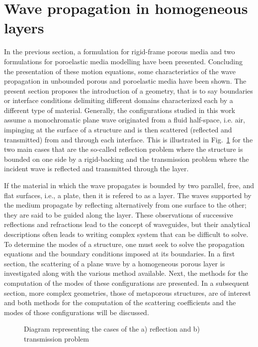 \section{Wave propagation in homogeneous layers}
In the previous section, a formulation for rigid-frame porous media and two formulations for poroelastic media modelling have been presented. Concluding the presentation of these motion equations, some characteristics of the wave propagation in unbounded porous and poroelastic media have been shown. The present section proposes the introduction of a geometry, that is to say boundaries or interface conditions delimiting different domains characterized each by a different type of material. Generally, the configurations studied in this work assume a monochromatic plane wave originated from a fluid half-space, i.e. air, impinging at the surface of a structure and is then scattered (reflected and transmitted) from and through each interface. This is illustrated in Fig.~\ref{fig:refl_transm_pb_schema} for the two main cases that are the so-called reflection problem where the structure is bounded on one side by a rigid-backing and the transmission problem where the incident wave is reflected and transmitted through the layer.

If the material in which the wave propagates is bounded by two parallel, free, and flat surfaces, i.e., a plate, then it is refered to as a layer. The waves supported by the medium propagate by reflecting alternatively from one surface to the other; they are said to be guided along the layer. These observations of successive reflections and refractions lead to the concept of waveguides, but their analytical descriptions often leads to writing complex system that can be difficult to solve. To determine the modes of a structure, one must seek to solve the propagation equations and the boundary conditions imposed at its boundaries. In a first section, the scattering of a plane wave by a homogeneous porous layer is investigated along with the various method available. Next, the methods for the computation of the modes of these configurations are presented. In a subsequent section, more complex geometries, those of metaporous structures, are of interest and both methods for the computation of the scattering coefficients and the modes of those configurations will be discussed.

\begin{figure}[htpb]
    \centering
    
    \caption{Diagram representing the cases of the a) reflection and b) transmission problem}
    \label{fig:refl_transm_pb_schema}
\end{figure}

